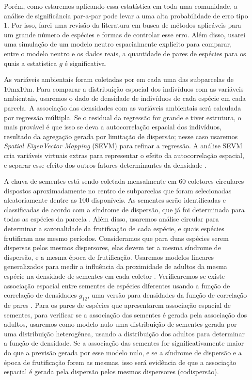 \documentclass[twoside,12pt,a4paper]{report}
\begin{document}
Porém, como estaremos aplicando essa estatística em toda uma
comunidade, a análise de significância par-a-par pode levar a uma alta probabilidade de erro tipo 1.
Por isso, farei uma revisão da literatura em busca de métodos aplicáveis para um grande número de
espécies e formas de controlar esse erro. Além disso, usarei uma simulação de um modelo neutro
espacialmente explícito para comparar, entre o modelo neutro e os dados reais, a quantidade de pares de espécies para os quais a estatística
$g$ é significativa.

As variáveis ambientais foram coletadas por \cite{Kelly} em cada uma das subparcelas de 10mx10m.
Para comparar a distribuição espacial dos indivíduos com as variáveis ambientais, usaremos o dado de
densidade de indivíduos de cada espécie em cada parcela. 
A associação das densidades com as variáveis ambientais será calculada por regressão
múltipla. Se o residual da regressão for grande e tiver estrutura, o mais provável é que isso
se deva a autocorrelação espacial dos indivíduos, resultado da agregação gerada por limitação
de dispersão; nesse caso usaremos {\em Spatial
EigenVector Mapping} (SEVM) para refinar a regressão. A análise SEVM cria variáveis virtuais
extras para representar o efeito da autocorrelação espacial, e separar esse efeito dos outros
fatores determinantes da densidade \citep{Dormann2007methods}.

A chuva de sementes está sendo coletada mensalmente em 60 coletores circulares dispostos
aproximadamente no centro de subparcelas que foram selecionadas aleatoriamente dentre as 100
disponíveis. As sementes serão identificadas e classificadas de acordo com a síndrome de
dispersão, que já foi determinada para todas as espécies da parcela \citep{martins2014}.
Além disso, usaremos análise circular para determinar a sazonalidade da frutificação de cada
espécie, e quais espécies frutificam nos mesmo períodos. Consideramos que para duas espécies
serem dispersas pelos mesmos dispersores, elas devem ter a mesma síndrome de dispersão, e a
mesma época de frutificação.
Usaremos modelos lineares generalizados para medir a influência da proximidade de adultos da mesma
espécie na densidade de sementes em cada coletor \citep{Hardesty2002}. 
Verificaremos se existe associação espacial entre sementes de espécies diferentes usando a
função de correlação de densidades $g_{12}$, uma versão para densidades da função de
correlação de pares \citep{Fedriani2015}. 
Para os pares de espécies que apresentarem associação espacial de sementes, para verificar se
a associação das sementes é gerada pela associação dos adultos, usaremos
como modelo nulo uma distribuição de sementes gerada por uma distribuição heterogênea, usando
a distribuição dos adultos para determinar a função de densidade.
Se a associação das sementes for significativamente maior do que a previsão gerada por esse modelo nulo,
e se a síndrome de dispersão e a época de frutificação forem as mesmas, isso será evidência
de que a associação espacial é gerada pela dispersão pelos mesmos dispersores (codispersão).
\end{document}

